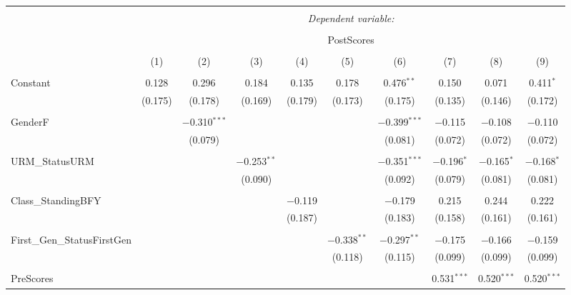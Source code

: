 
\begin{table}[!htbp] \centering 
  \caption{} 
  \label{} 
\begin{tabular}{@{\extracolsep{5pt}}lccccccccc} 
\\[-1.8ex]\hline 
\hline \\[-1.8ex] 
 & \multicolumn{9}{c}{\textit{Dependent variable:}} \\ 
\cline{2-10} 
\\[-1.8ex] & \multicolumn{9}{c}{PostScores} \\ 
\\[-1.8ex] & (1) & (2) & (3) & (4) & (5) & (6) & (7) & (8) & (9)\\ 
\hline \\[-1.8ex] 
 Constant & 0.128 & 0.296 & 0.184 & 0.135 & 0.178 & 0.476$^{**}$ & 0.150 & 0.071 & 0.411$^{*}$ \\ 
  & (0.175) & (0.178) & (0.169) & (0.179) & (0.173) & (0.175) & (0.135) & (0.146) & (0.172) \\ 
  & & & & & & & & & \\ 
 GenderF &  & $-$0.310$^{***}$ &  &  &  & $-$0.399$^{***}$ & $-$0.115 & $-$0.108 & $-$0.110 \\ 
  &  & (0.079) &  &  &  & (0.081) & (0.072) & (0.072) & (0.072) \\ 
  & & & & & & & & & \\ 
 URM\_StatusURM &  &  & $-$0.253$^{**}$ &  &  & $-$0.351$^{***}$ & $-$0.196$^{*}$ & $-$0.165$^{*}$ & $-$0.168$^{*}$ \\ 
  &  &  & (0.090) &  &  & (0.092) & (0.079) & (0.081) & (0.081) \\ 
  & & & & & & & & & \\ 
 Class\_StandingBFY &  &  &  & $-$0.119 &  & $-$0.179 & 0.215 & 0.244 & 0.222 \\ 
  &  &  &  & (0.187) &  & (0.183) & (0.158) & (0.161) & (0.161) \\ 
  & & & & & & & & & \\ 
 First\_Gen\_StatusFirstGen &  &  &  &  & $-$0.338$^{**}$ & $-$0.297$^{**}$ & $-$0.175 & $-$0.166 & $-$0.159 \\ 
  &  &  &  &  & (0.118) & (0.115) & (0.099) & (0.099) & (0.099) \\ 
  & & & & & & & & & \\ 
 PreScores &  &  &  &  &  &  & 0.531$^{***}$ & 0.520$^{***}$ & 0.520$^{***}$ \\ 

\end{tabular}
\end{table}
